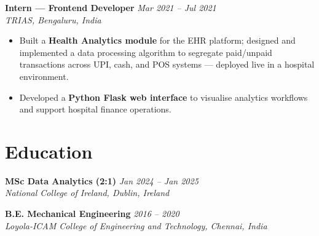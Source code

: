 \documentclass[11pt, a4paper]{article}
\begin{document}
\vspace{4pt}
\noindent
{\small\textbf{Intern --- Frontend Developer} \hfill \textit{Mar 2021 -- Jul 2021}}\\[-2pt]
{\small\textit{TRIAS, Bengaluru, India}}

\begin{itemize}\small
  \item Built a \textbf{Health Analytics module} for the EHR platform; designed and implemented a data processing algorithm to segregate paid/unpaid transactions across UPI, cash, and POS systems --- deployed live in a hospital environment.
  \item Developed a \textbf{Python Flask web interface} to visualise analytics workflows and support hospital finance operations.
\end{itemize}

\section{Education}

\noindent
{\small\textbf{MSc Data Analytics (2:1)} \hfill \textit{Jan 2024 -- Jan 2025}}\\[-2pt]
{\small\textit{National College of Ireland, Dublin, Ireland}}

\vspace{5pt}
\noindent
{\small\textbf{B.E. Mechanical Engineering} \hfill \textit{2016 -- 2020}}\\[-2pt]
{\small\textit{Loyola-ICAM College of Engineering and Technology, Chennai, India}}

\end{document}

